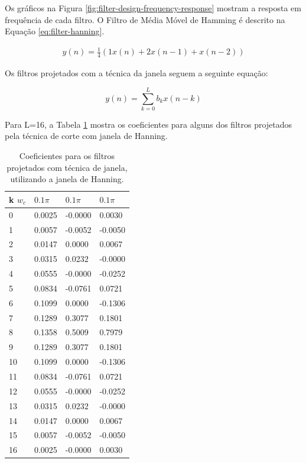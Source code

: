 Os gráficos na Figura \ref{fig:filter-design-frequency-response} mostram a
resposta em frequência de cada filtro. O Filtro de Média Móvel de Hamming é
descrito na Equação \ref{eq:filter-hanning}.

\begin{align}
\label{eq:filter-hanning}
y(n) = \frac{1}{4}(1 x(n) + 2 x(n-1) + x(n-2))
\end{align}

Os filtros projetados com a técnica da janela seguem a seguinte equação:

\begin{equation}
	y(n) = \sum_{k=0}^L b_k x(n-k)
\end{equation}

Para L=16, a Tabela \ref{tab:fir-filters-coefs} mostra os coeficientes para
alguns dos filtros projetados pela técnica de corte com janela de Hanning.

\begin{table}
\centering
\begin{tabular}{|l|l|l|l|}\hline
k \/$w_c$ & $0.1\pi$ & $0.1\pi$ & $0.1\pi$ \\ \hline
  0	& 0.0025	&   -0.0000	&		0.0030 \\		
 1	& 0.0057	&   -0.0052	&	   -0.0050 \\	
 2	& 0.0147	&    0.0000	&	    0.0067 \\	
 3	& 0.0315	&    0.0232	&	   -0.0000 \\	
 4	& 0.0555	&   -0.0000	&	   -0.0252 \\	
 5	& 0.0834	&   -0.0761	&	    0.0721 \\	
 6	& 0.1099	&    0.0000	&	   -0.1306 \\	
 7	& 0.1289	&    0.3077	&	    0.1801 \\	
 8	& 0.1358	&    0.5009	&	    0.7979 \\	
 9	& 0.1289	&    0.3077	&	    0.1801 \\	
10	& 0.1099	&    0.0000	&	   -0.1306 \\	
11	& 0.0834	&   -0.0761	&	    0.0721 \\	
12	& 0.0555	&   -0.0000	&	   -0.0252 \\	
13	& 0.0315	&    0.0232	&	   -0.0000 \\	
14	& 0.0147	&    0.0000	&	    0.0067 \\	
15	& 0.0057	&   -0.0052	&	   -0.0050 \\	
16	& 0.0025	&   -0.0000	&	    0.0030 \\
\hline
\end{tabular}

\caption{Coeficientes para os filtros projetados com técnica de janela,
utilizando a janela de Hanning.}

\label{tab:fir-filters-coefs}
\end{table}


